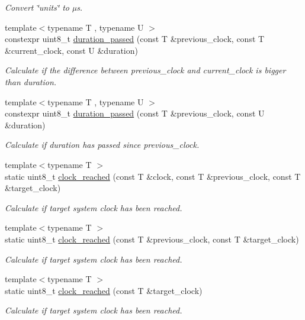 \begin{DoxyCompactItemize}
\begin{DoxyCompactList}\small\item\em Convert \char`\"{}units\char`\"{} to µs. \end{DoxyCompactList}\item 
{\footnotesize template$<$typename T , typename U $>$ }\\constexpr uint8\+\_\+t \hyperlink{namespaceclock_a2818f7b058e27771426f39c7aa0365cd}{duration\+\_\+passed} (const T \&previous\+\_\+clock, const T \&current\+\_\+clock, const U \&duration)
\begin{DoxyCompactList}\small\item\em Calculate if the difference between previous\+\_\+clock and current\+\_\+clock is bigger than duration. \end{DoxyCompactList}\item 
{\footnotesize template$<$typename T , typename U $>$ }\\constexpr uint8\+\_\+t \hyperlink{namespaceclock_a4db26a90b5c001f2bb46af7a2069d63d}{duration\+\_\+passed} (const T \&previous\+\_\+clock, const U \&duration)
\begin{DoxyCompactList}\small\item\em Calculate if duration has passed since previous\+\_\+clock. \end{DoxyCompactList}\item 
{\footnotesize template$<$typename T $>$ }\\static uint8\+\_\+t \hyperlink{namespaceclock_a107ad02a77763be28bf63d43c566cf75}{clock\+\_\+reached} (const T \&clock, const T \&previous\+\_\+clock, const T \&target\+\_\+clock)
\begin{DoxyCompactList}\small\item\em Calculate if target system clock has been reached. \end{DoxyCompactList}\item 
{\footnotesize template$<$typename T $>$ }\\static uint8\+\_\+t \hyperlink{namespaceclock_aae7a34ec30a2420b2b51e717ab02c400}{clock\+\_\+reached} (const T \&previous\+\_\+clock, const T \&target\+\_\+clock)
\begin{DoxyCompactList}\small\item\em Calculate if target system clock has been reached. \end{DoxyCompactList}\item 
{\footnotesize template$<$typename T $>$ }\\static uint8\+\_\+t \hyperlink{namespaceclock_a240d81de9119f92701aa5f26555972c4}{clock\+\_\+reached} (const T \&target\+\_\+clock)
\begin{DoxyCompactList}\small\item\em Calculate if target system clock has been reached. \end{DoxyCompactList}\end{DoxyCompactItemize}
